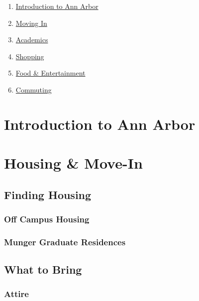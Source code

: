 \documentclass[
]{book}
\providecommand{\tightlist}{%
  \setlength{\itemsep}{0pt}\setlength{\parskip}{0pt}}
\begin{document}
\begin{enumerate}
\def\labelenumi{\arabic{enumi}.}
\tightlist
\item
  \protect\hyperlink{introduction}{Introduction to Ann Arbor}
\item
  \protect\hyperlink{move-in}{Moving In}
\item
  \protect\hyperlink{academics}{Academics}
\item
  \protect\hyperlink{shopping}{Shopping}
\item
  \protect\hyperlink{food-entertainment}{Food \& Entertainment}
\item
  \protect\hyperlink{commuting}{Commuting}
\end{enumerate}

\hypertarget{introduction-to-ann-arbor}{%
\chapter{Introduction to Ann Arbor}\label{introduction-to-ann-arbor}}

\hypertarget{move-in}{%
\chapter{Housing \& Move-In}\label{move-in}}

\hypertarget{finding-housing}{%
\section{Finding Housing}\label{finding-housing}}

\hypertarget{off-campus-housing}{%
\subsection{Off Campus Housing}\label{off-campus-housing}}

\hypertarget{munger-graduate-residences}{%
\subsection{Munger Graduate Residences}\label{munger-graduate-residences}}

\hypertarget{what-to-bring}{%
\section{What to Bring}\label{what-to-bring}}

\hypertarget{attire}{%
\subsection{Attire}\label{attire}}
\end{document}
